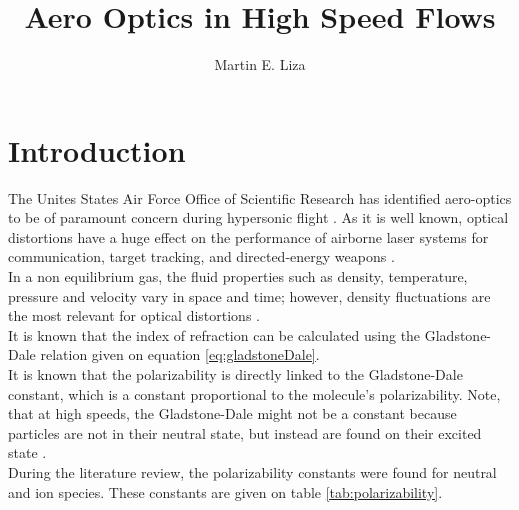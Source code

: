 



     \usepackage{setspace} 
\title{\textbf{Aero Optics in High Speed Flows}}
\author{Martin E. Liza}
\usepackage[backend=biber, sorting=none]{biblatex}



    \maketitle 
    \section{Introduction} 
        \indent The Unites States Air Force Office of Scientific Research has identified aero-optics to be of paramount concern during hypersonic flight \cite{jones:usafte:2009}. As it is well known, optical distortions have a huge effect on the performance of airborne laser systems for communication, target tracking, and directed-energy weapons \cite{wang:arofm:2012}. \\

        \indent In a non equilibrium gas, the fluid properties such as density, temperature, pressure and velocity vary in space and time; however, density fluctuations are the most relevant for optical distortions \cite{wyckhman:aiaa:2009}. \\ 

        \indent It is known that the index of refraction can be calculated using the Gladstone-Dale relation given on equation \eqref{eq:gladstoneDale}.  \\

        \indent It is known that the polarizability is directly linked to the Gladstone-Dale constant, which is a constant proportional to the molecule's polarizability. Note, that at high speeds, the Gladstone-Dale might not be a constant because particles are not in their neutral state, but instead are found on their excited state \cite{tropina:plc:2018}. \\

        \indent During the literature review, the polarizability constants were found for neutral and ion species. These constants are given on table \ref{tab:polarizability}. 

